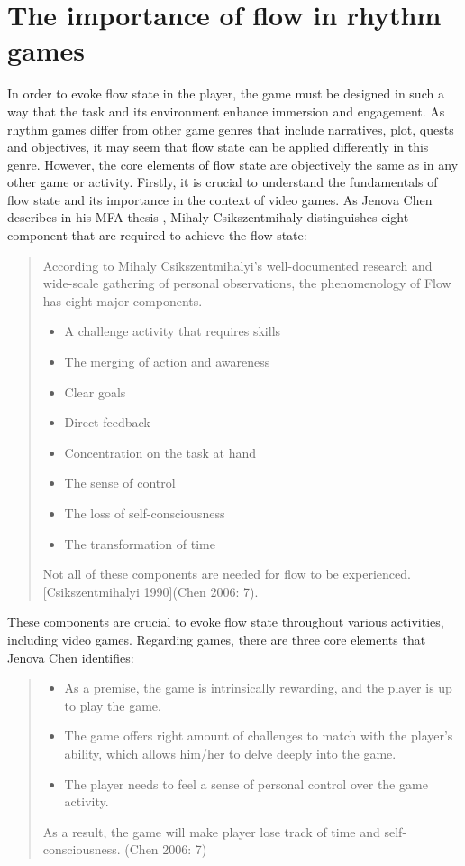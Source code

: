 \section{The importance of flow in rhythm games}
In order to evoke flow state in the player, the game must be designed in such a way that the task and its environment enhance immersion and engagement. As rhythm games differ from other game genres that include narratives, plot, quests and objectives, it may seem that flow state can be applied differently in this genre. However, the core elements of flow state are objectively the same as in any other game or activity.
Firstly, it is crucial to understand the fundamentals of flow state and its importance in the context of video games. As Jenova Chen describes in his MFA thesis \cite{chen2006flow}, Mihaly Csikszentmihaly distinguishes eight component that are required to achieve the flow state:
\begin{quote}
According to Mihaly Csikszentmihalyi’s well-documented research and wide-scale
gathering of personal observations, the phenomenology of Flow has eight major
components.
\begin {itemize}
\item A challenge activity that requires skills
\item The merging of action and awareness
\item Clear goals
\item Direct feedback
\item Concentration on the task at hand
\item The sense of control
\item The loss of self-consciousness
\item The transformation of time
\end {itemize}
Not all of these components are needed for flow to be experienced. [Csikszentmihalyi 1990](Chen 2006: 7).
\end{quote}

These components are crucial to evoke flow state throughout various activities, including video games. Regarding games, there are three core elements that Jenova Chen identifies:
\begin{quote}
\begin {itemize}
\item As a premise, the game is intrinsically rewarding, and the player is up to play the game.
\item The game offers right amount of challenges to match with the player’s ability, which allows him/her to delve deeply into the game.
\item The player needs to feel a sense of personal control over the game activity. 
\end {itemize}
As a result, the game will make player lose track of time and self-consciousness. (Chen 2006: 7)
\end{quote}

